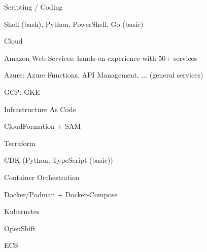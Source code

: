 

\begin{cvskills}

  \cvskill
    {Scripting / Coding} %
    {
      \begin{cvitems} %
        \item {Shell (bash), Python, PowerShell, Go (basic)} %
      \end{cvitems}
    }

  \cvskill
    {Cloud} %
    {
      \begin{cvitems} %
        \item {Amazon Web Services: hands-on experience with 50+ services} %
        \item {Azure: Azure Functions, API Management, ... (general services)} %
        \item {GCP: GKE} %
      \end{cvitems}
    }

  \cvskill
    {Infrastructure As Code} %
    {
      \begin{cvitems} %
        \item {CloudFormation + SAM} %
        \item {Terraform} %
        \item {CDK (Python, TypeScript (basic))} %
      \end{cvitems}
    }

  \cvskill
    {Container Orchestration} %
    {
      \begin{cvitems} %
        \item {Docker/Podman + Docker-Compose} %
        \item {Kubernetes} %
        \item {OpenShift} %
        \item {ECS} %
      \end{cvitems}
    }


\end{cvskills}
